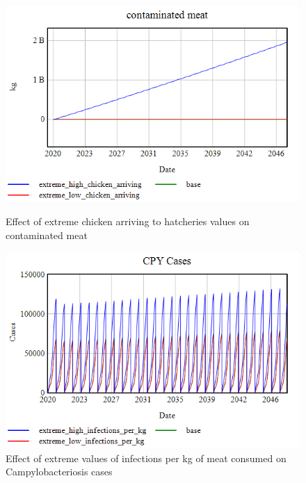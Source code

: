\begin{figure}[h!]
    \centering
    \begin{minipage}{0.45\textwidth}
        \centering
        \includegraphics[width=\textwidth]{images/extremes/Chicken_arriving_contaminated_meat.png} 
        \caption{Effect of extreme chicken arriving to hatcheries values on contaminated meat}
        \label{fig:chicken_meat}
    \end{minipage}
    \begin{minipage}{0.45\textwidth}
        \centering
        \includegraphics[width=\textwidth]{images/extremes/Infections_per_kg_CPY_cases.png} 
        \caption{Effect of extreme values of infections per kg of meat consumed on Campylobacteriosis cases}
        \label{fig:infections_cases}
    \end{minipage}
\end{figure}

